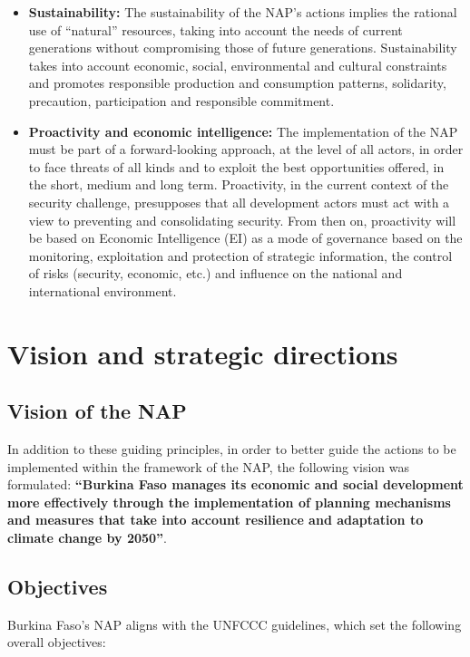 \documentclass[
]{book}
\begin{document}
\begin{itemize}
\item
  \textbf{Sustainability:} The sustainability of the NAP's actions implies the rational use of ``natural'' resources, taking into account the needs of current generations without compromising those of future generations. Sustainability takes into account economic, social, environmental and cultural constraints and promotes responsible production and consumption patterns, solidarity, precaution, participation and responsible commitment.
\item
  \textbf{Proactivity and economic intelligence:} The implementation of the NAP must be part of a forward-looking approach, at the level of all actors, in order to face threats of all kinds and to exploit the best opportunities offered, in the short, medium and long term. Proactivity, in the current context of the security challenge, presupposes that all development actors must act with a view to preventing and consolidating security. From then on, proactivity will be based on Economic Intelligence (EI) as a mode of governance based on the monitoring, exploitation and protection of strategic information, the control of risks (security, economic, etc.) and influence on the national and international environment.
\end{itemize}

\section{Vision and strategic directions}\label{vision-and-strategic-directions}

\subsection{Vision of the NAP}\label{vision-of-the-nap}

In addition to these guiding principles, in order to better guide the actions to be implemented within the framework of the NAP, the following vision was formulated: \textbf{``Burkina Faso manages its economic and social development more effectively through the implementation of planning mechanisms and measures that take into account resilience and adaptation to climate change by 2050''}.

\subsection{Objectives}\label{objectives}

Burkina Faso's NAP aligns with the UNFCCC guidelines, which set the following overall objectives:
\end{document}
